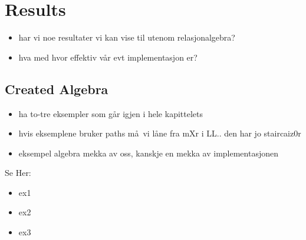 \chapter{Results}
\label{chapter:results}
\begin{itemize}
  \item har vi noe resultater vi kan vise til utenom relasjonalgebra?
  \item hva med hvor effektiv v\aa r evt implementasjon er?
\end{itemize}

\section{Created Algebra}
\begin{itemize}
  \item ha to-tre eksempler som g\aa r igjen i hele kapittelets
  \item hvis eksemplene bruker paths m\aa~vi l\aa ne fra mXr i LL.. den har jo staircaiz0r
  \item eksempel algebra mekka av oss, kanskje en mekka av implementasjonen
\end{itemize}

Se Her:
\begin{itemize}
  \item ex1
  \item ex2
  \item ex3
\end{itemize}







